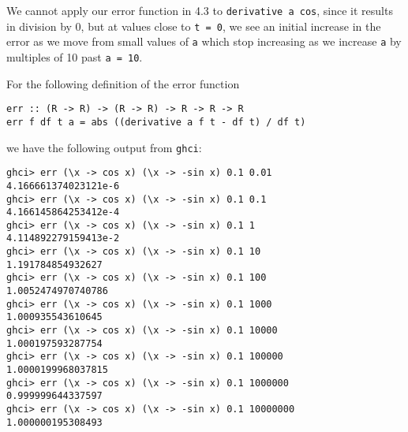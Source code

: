 
We cannot apply our error function in 4.3 to \verb|derivative a cos|, since it results in 
division by 0, but at values close to \verb|t = 0|, we see an initial increase in the error 
as we move from small values of \verb|a| which stop increasing as we increase \verb|a| by 
multiples of 10 past \verb|a = 10|.\par
\qquad For the following definition of the error function
\scriptsize\begin{verbatim}
err :: (R -> R) -> (R -> R) -> R -> R -> R
err f df t a = abs ((derivative a f t - df t) / df t)   
\end{verbatim}\normalsize
we have the following output from \verb|ghci|:
\scriptsize\begin{verbatim}
ghci> err (\x -> cos x) (\x -> -sin x) 0.1 0.01
4.166661374023121e-6
ghci> err (\x -> cos x) (\x -> -sin x) 0.1 0.1
4.166145864253412e-4
ghci> err (\x -> cos x) (\x -> -sin x) 0.1 1
4.114892279159413e-2
ghci> err (\x -> cos x) (\x -> -sin x) 0.1 10
1.191784854932627
ghci> err (\x -> cos x) (\x -> -sin x) 0.1 100
1.0052474970740786
ghci> err (\x -> cos x) (\x -> -sin x) 0.1 1000
1.000935543610645
ghci> err (\x -> cos x) (\x -> -sin x) 0.1 10000
1.000197593287754
ghci> err (\x -> cos x) (\x -> -sin x) 0.1 100000
1.0000199968037815
ghci> err (\x -> cos x) (\x -> -sin x) 0.1 1000000
0.999999644337597
ghci> err (\x -> cos x) (\x -> -sin x) 0.1 10000000
1.000000195308493
\end{verbatim}\normalsize
